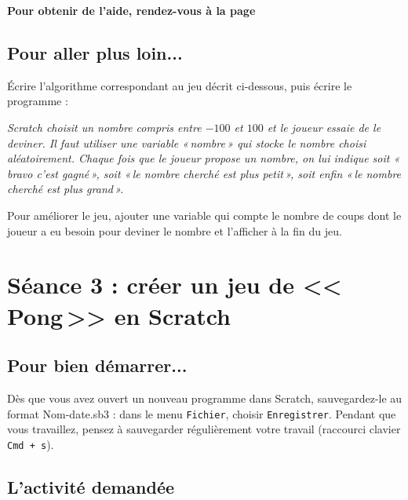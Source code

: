 \textbf{Pour obtenir de l'aide, rendez-vous à la page \pageref{aide_seanceScratch2}}




\subsection{Pour aller plus loin...}

Écrire l'algorithme correspondant au jeu décrit ci-dessous, puis écrire le programme :

\vspace{6pt}

\emph{Scratch choisit un nombre compris entre $-100$ et $100$ et le joueur essaie de le deviner. Il faut utiliser une variable «\,nombre\,» qui stocke le nombre choisi aléatoirement. Chaque fois que le joueur propose un nombre, on lui indique soit «\,bravo c'est gagné\,», soit «\,le nombre cherché est plus petit\,», soit enfin «\,le nombre cherché est plus grand\,».}

\vspace{6pt}

Pour améliorer le jeu, ajouter une variable qui compte le nombre de coups dont le joueur a eu besoin pour deviner le nombre et l'afficher à la fin du jeu.

\newpage

%
%
%
%




\section{Séance 3 : créer un jeu de <<\,Pong\,>> en Scratch}\label{ficheScratch5e3}


\subsection{Pour bien démarrer...}

Dès que vous avez ouvert un nouveau programme dans Scratch, sauvegardez-le au format Nom-date.sb3 : dans le menu \texttt{Fichier}, choisir \texttt{Enregistrer}. Pendant que vous travaillez, pensez à sauvegarder régulièrement votre travail (raccourci clavier \texttt{Cmd + s}).   


\subsection{L'activité demandée}

